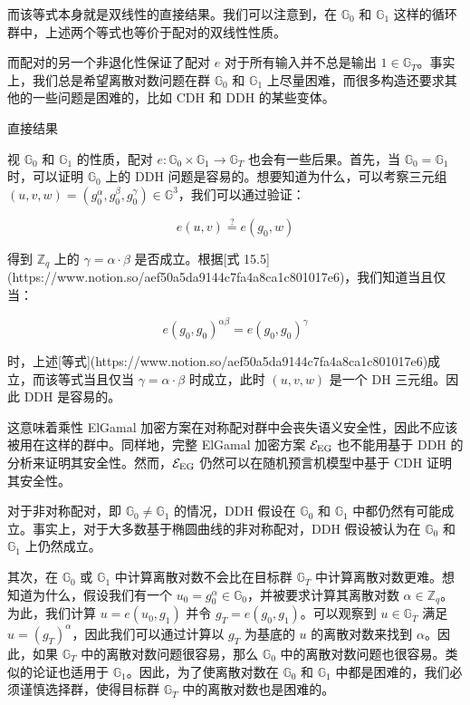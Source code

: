 而该等式本身就是双线性的直接结果。我们可以注意到，在 $\mathbb{G}_0$ 和 $\mathbb{G}_1$ 这样的循环群中，上述两个等式也等价于配对的双线性性质。

而配对的另一个非退化性保证了配对 $e$ 对于所有输入并不总是输出 $1 \in \mathbb{G}_T$。事实上，我们总是希望离散对数问题在群 $\mathbb{G}_0$ 和 $\mathbb{G}_1$ 上尽量困难，而很多构造还要求其他的一些问题是困难的，比如 CDH 和 DDH 的某些变体。

直接结果

视 $\mathbb{G}_0$ 和 $\mathbb{G}_1$ 的性质，配对 $e:\mathbb{G}_0 \times \mathbb{G}_1 \to \mathbb{G}_T$ 也会有一些后果。首先，当 $\mathbb{G}_0=\mathbb{G}_1$ 时，可以证明 $\mathbb{G}_0$ 上的 DDH 问题是容易的。想要知道为什么，可以考察三元组 $(u,v,w)=(g_0^\alpha,g_0^\beta,g_0^\gamma)\in\mathbb{G}^3$，我们可以通过验证：

$$
e(u,v)\overset{?}=e(g_0,w)
$$

得到 $\mathbb{Z}_q$ 上的 $\gamma=\alpha\cdot\beta$ 是否成立。根据[式 15.5](https://www.notion.so/aef50a5da9144c7fa4a8ca1c801017e6)，我们知道当且仅当：

$$
e(g_0,g_0)^{\alpha\beta}=e(g_0,g_0)^\gamma
$$

时，上述[等式](https://www.notion.so/aef50a5da9144c7fa4a8ca1c801017e6)成立，而该等式当且仅当 $\gamma=\alpha\cdot\beta$ 时成立，此时 $(u,v,w)$ 是一个 DH 三元组。因此 DDH 是容易的。

这意味着乘性 ElGamal 加密方案在对称配对群中会丧失语义安全性，因此不应该被用在这样的群中。同样地，完整 ElGamal 加密方案 $\mathcal{E}_{\rm EG}$ 也不能用基于 DDH 的分析来证明其安全性。然而，$\mathcal{E}_{\rm EG}$ 仍然可以在随机预言机模型中基于 CDH 证明其安全性。

对于非对称配对，即 $\mathbb{G}_0\neq\mathbb{G}_1$ 的情况，DDH 假设在 $\mathbb{G}_0$ 和 $\mathbb{G}_1$ 中都仍然有可能成立。事实上，对于大多数基于椭圆曲线的非对称配对，DDH 假设被认为在 $\mathbb{G}_0$ 和 $\mathbb{G}_1$ 上仍然成立。

其次，在 $\mathbb{G}_0$ 或 $\mathbb{G}_1$ 中计算离散对数不会比在目标群 $\mathbb{G}_T$ 中计算离散对数更难。想知道为什么，假设我们有一个 $u_0=g_0^\alpha\in\mathbb{G}_0$，并被要求计算其离散对数 $\alpha\in\mathbb{Z}_q$。为此，我们计算 $u=e(u_0,g_1)$ 并令 $g_T=e(g_0,g_1)$。可以观察到 $u\in\mathbb{G}_T$ 满足 $u=(g_T)^\alpha$，因此我们可以通过计算以 $g_T$ 为基底的 $u$ 的离散对数来找到 $\alpha$。因此，如果 $\mathbb{G}_T$ 中的离散对数问题很容易，那么 $\mathbb{G}_0$ 中的离散对数问题也很容易。类似的论证也适用于 $\mathbb{G}_1$。因此，为了使离散对数在 $\mathbb{G}_0$ 和 $\mathbb{G}_1$ 中都是困难的，我们必须谨慎选择群，使得目标群 $\mathbb{G}_T$ 中的离散对数也是困难的。

